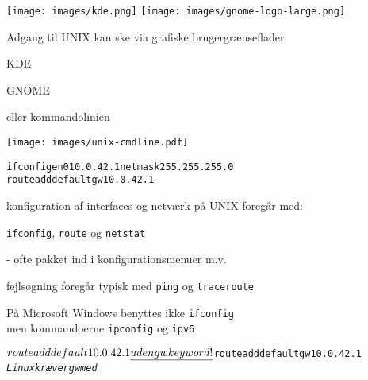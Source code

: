 \documentclass[Screen16to9,17pt,footrule]{foils}
\begin{document}

\begin{center}
\texttt{[image: images/kde.png]}
\texttt{[image: images/gnome-logo-large.png]}
\end{center}

\begin{list1}
\item Adgang til UNIX kan ske via grafiske brugergrænseflader
  \begin{list2}
  \item KDE 
  \item GNOME 
  \end{list2}
\item eller kommandolinien
\end{list1}
\centerline{\texttt{[image: images/unix-cmdline.pdf]}}






\begin{alltt}
ifconfig en0 10.0.42.1 netmask 255.255.255.0
route add default gw 10.0.42.1
\end{alltt}

\begin{list1}
\item konfiguration af interfaces og netværk på UNIX foregår med:
\item \verb+ifconfig+, \verb+route+ og \verb+netstat+
\item - ofte pakket ind i konfigurationsmenuer m.v.
\item fejlsøgning foregår typisk med \verb+ping+ og \verb+traceroute+
\item På Microsoft Windows benyttes ikke \verb+ifconfig+\\
men kommandoerne \verb+ipconfig+ og \verb+ipv6+
\end{list1}



\begin{alltt}
$ route add default 10.0.42.1
\emph{uden gw keyword!}

$ route add default gw 10.0.42.1
\emph{Linux kræver gw med}
\end{alltt}
\end{document}
